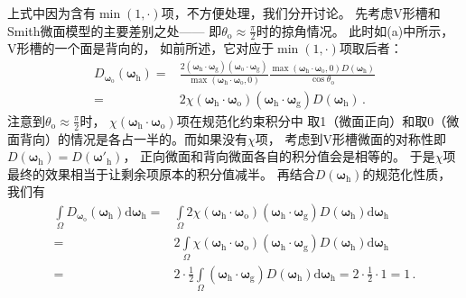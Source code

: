 上式中因为含有$\min(1,\cdot)$项，不方便处理，我们分开讨论。
先考虑V形槽和Smith微面模型的主要差别之处——
即$\displaystyle\theta_{\mathrm{o}}\approx\frac{\pi}{2}$时的掠角情况。
此时如(a)中所示，V形槽的一个面是背向的，
如前所述，它对应于$\min(1,\cdot)$项取后者：
\begin{align}
    D_{{\bm\omega}_{\mathrm{o}}}({\bm\omega}_{\mathrm{h}})
    = & \frac{2({\bm\omega}_{\mathrm{h}}\cdot{\bm\omega}_{\mathrm{g}})
    ({\bm\omega}_{\mathrm{o}}\cdot{\bm\omega}_{\mathrm{g}})}
    {\max({\bm\omega}_{\mathrm{h}}\cdot{\bm\omega}_{\mathrm{o}},0)}
    \frac{\max({\bm\omega}_{\mathrm{h}}\cdot{\bm\omega}_{\mathrm{o}},0)
        D({\bm\omega}_{\mathrm{h}})}{\cos\theta_{\mathrm{o}}}\nonumber \\
    = & 2\chi({\bm\omega}_{\mathrm{h}}\cdot{\bm\omega}_{\mathrm{o}})
    ({\bm\omega}_{\mathrm{h}}\cdot{\bm\omega}_{\mathrm{g}})
    D({\bm\omega}_{\mathrm{h}})\, .
\end{align}
注意到$\displaystyle\theta_{\mathrm{o}}\approx\frac{\pi}{2}$时，
$\chi({\bm\omega}_{\mathrm{h}}\cdot{\bm\omega}_{\mathrm{o}})$项在规范化约束积分中
取1（微面正向）和取0（微面背向）的情况是各占一半的。而如果没有$\chi$项，
考虑到V形槽微面的对称性即$D({\bm\omega}_{\mathrm{h}})=D({\bm\omega}'_{\mathrm{h}})$，
正向微面和背向微面各自的积分值会是相等的。
于是$\chi$项最终的效果相当于让剩余项原本的积分值减半。
再结合$D({\bm\omega}_{\mathrm{h}})$的规范化性质，
我们有
\begin{align}
    \int\limits_{\varOmega}D_{{\bm\omega}_{\mathrm{o}}}({\bm\omega}_{\mathrm{h}})
    \mathrm{d}{\bm\omega}_{\mathrm{h}}
    = & \int\limits_{\varOmega}2\chi({\bm\omega}_{\mathrm{h}}\cdot{\bm\omega}_{\mathrm{o}})
    ({\bm\omega}_{\mathrm{h}}\cdot{\bm\omega}_{\mathrm{g}})
    D({\bm\omega}_{\mathrm{h}})\mathrm{d}{\bm\omega}_{\mathrm{h}}\nonumber                              \\
    = & 2\int\limits_{\varOmega}\chi({\bm\omega}_{\mathrm{h}}\cdot{\bm\omega}_{\mathrm{o}})
    ({\bm\omega}_{\mathrm{h}}\cdot{\bm\omega}_{\mathrm{g}})
    D({\bm\omega}_{\mathrm{h}})\mathrm{d}{\bm\omega}_{\mathrm{h}}\nonumber                              \\
    = & 2\cdot\frac{1}{2}\int\limits_{\varOmega}({\bm\omega}_{\mathrm{h}}\cdot{\bm\omega}_{\mathrm{g}})
    D({\bm\omega}_{\mathrm{h}})\mathrm{d}{\bm\omega}_{\mathrm{h}}=2\cdot\frac{1}{2}\cdot1=1\, .
\end{align}

